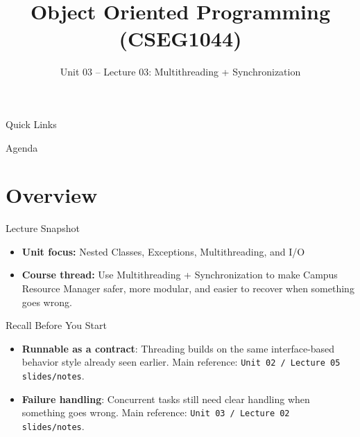 \documentclass{beamer}
\title[OOPS with Java]{Object Oriented Programming (CSEG1044)}
\subtitle{Unit 03 -- Lecture 03: Multithreading + Synchronization}
\begin{document}
\begin{frame}[fragile]
  \titlepage
  \vspace{0.5em}
  \slidesources{\OOPSUnitIIISources}
\end{frame}

\begin{frame}{Quick Links}
  \centering
  \hyperlink{sec:overview}{}\hspace{0.6em}
  \hyperlink{sec:concepts}{}\hspace{0.6em}
  \hyperlink{sec:demo}{}\hspace{0.6em}
  \hyperlink{sec:summary}{}
  \slidesources{\OOPSUnitIIISources}
\end{frame}

\begin{frame}{Agenda}
  \tableofcontents
  \slidesources{\OOPSUnitIIISources}
\end{frame}

\section{Overview}
\label{sec:overview}

\begin{frame}{Lecture Snapshot}
\begin{itemize}[<+->]
  \item \textbf{Unit focus:} Nested Classes, Exceptions, Multithreading, and I/O
  \item \textbf{Course thread:} Use Multithreading + Synchronization to make Campus Resource Manager safer, more modular, and easier to recover when something goes wrong.
\end{itemize}
  \slidesources{\OOPSUnitIIISources}
\end{frame}

\begin{frame}{Recall Before You Start}
\begin{itemize}[<+->]
  \item \textbf{Runnable as a contract}: Threading builds on the same interface-based behavior style already seen earlier. Main reference: \texttt{Unit 02 / Lecture 05 slides/notes}.
  \item \textbf{Failure handling}: Concurrent tasks still need clear handling when something goes wrong. Main reference: \texttt{Unit 03 / Lecture 02 slides/notes}.
\end{itemize}
  \slidesources{\OOPSUnitIIISources}
\end{frame}
\end{document}
